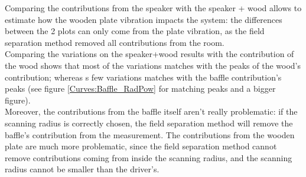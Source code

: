 \documentclass{report}
\begin{document}
Comparing the contributions from the speaker with the speaker + wood allows to estimate how the wooden plate vibration impacts the system: the differences between the 2 plots can only come from the plate vibration, as the field separation method removed all contributions from the room. \\
Comparing the variations on the speaker+wood results with the contribution of the wood shows that most of the variations matches with the peaks of the wood's contribution; whereas s few variations matches with the baffle contribution's peaks (see figure \ref{Curves:Baffle_RadPow} for matching peaks and a bigger figure). \\

Moreover, the contributions from the baffle itself aren't really problematic: if the scanning radius is correctly chosen, the field separation method will remove the baffle's contribution from the measurement. The contributions from the wooden plate are much more problematic, since the field separation method cannot remove contributions coming from inside the scanning radius, and the scanning radius cannot be smaller than the driver's. 
\end{document}
